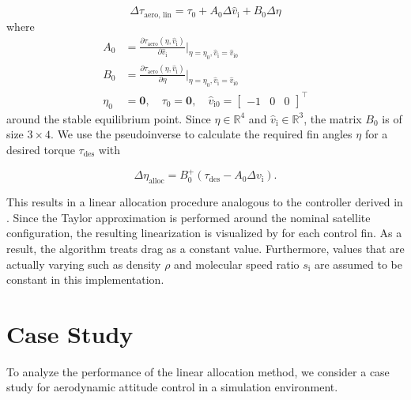 \documentclass[pdflatex,sn-mathphys-num]{sn-jnl}%
\theoremstyle{thmstyleone}%
\theoremstyle{thmstyletwo}%
\theoremstyle{thmstylethree}%
\begin{document}
	\begin{equation}
		\Delta\tau_{\text{aero, lin}} = \tau_0 + A_0 \Delta \hat{v}_{\text{i}} + B_0\Delta \eta
	\end{equation}
	where
	\begin{align}
		A_0 &= \frac{\partial \tau_{\text{aero}}(\eta,\hat{v}_{\text{i}})}{\partial \hat{v}_{\text{i}}} \bigg|_{\eta = \eta_0, \hat{v}_{\text{i}} = \hat{v}_{\text{i}0}} \\
		B_0 &= \frac{\partial \tau_{\text{aero}}(\eta,\hat{v}_{\text{i}})}{\partial \eta} \bigg|_{\eta = \eta_0, \hat{v}_{\text{i}} = \hat{v}_{\text{i}0}}\\
		\eta_0 &= \mathbf{0}, \quad \tau_0 = \mathbf{0}, 
		\quad \hat{v}_{\text{i}0} = \begin{bmatrix}-1 & 0 & 0\end{bmatrix}^{\top}
	\end{align}
	around the stable equilibrium point. Since $\eta\in \mathbb{R}^4$ and $\hat{v}_{\text{i}} \in \mathbb{R}^3$, the matrix $B_0$ is of size $3\times 4$.
	We use the pseudoinverse to calculate the required fin angles $\eta$ for a desired torque $\tau_{\text{des}}$ with

	\begin{equation}
		\Delta \eta_{\text{alloc}} = B_0^+ (\tau_{\text{des}} - A_0 \Delta v_{\text{i}}).
	\end{equation}

	This results in a linear allocation procedure analogous to the controller derived in \cite{chenAerodynamicAttitudeControl2023}. Since the Taylor approximation is performed around the nominal satellite configuration, the resulting linearization is visualized by  for each control fin. As a result, the algorithm treats drag as a constant value. Furthermore, values that are actually varying such as density $\rho$ and molecular speed ratio $s_{\text{i}}$ are assumed to be constant in this implementation.

    \section{Case Study}
	\label{sec:case_study}
	To analyze the performance of the linear allocation method, we consider a case study for aerodynamic attitude control in a simulation environment.

	
\end{document}
